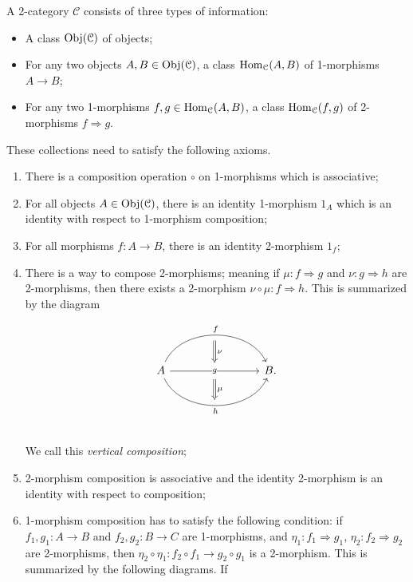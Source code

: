\documentclass[11pt, letterpaper]{article}
\begin{document}
\begin{definition}\label{dfn:8}
	A 2-category $\mathcal{C} $ consists of three types of information:
	\begin{itemize}
		\item A class $\operatorname{Obj}(\mathcal{C} ) $ of objects;
		\item For any two objects $A,B\in \operatorname{Obj}(\mathcal{C} ) $, a class $\operatorname{Hom}_{\mathcal{C} }(A, B) $ of 1-morphisms $A\to B$;
		\item For any two 1-morphisms $f,g\in \operatorname{Hom}_{\mathcal{C} }(A, B) $, a class $\operatorname{Hom}_{\mathcal{C} }(f, g) $ of 2-morphisms $f \Rightarrow g$.
	\end{itemize}
	These collections need to satisfy the following axioms.
	\begin{enumerate}
		\item There is a composition operation $\circ $ on 1-morphisms which is associative;
		\item For all objects $A\in \operatorname{Obj}(\mathcal{C} ) $, there is an identity 1-morphism $1_A$ which is an identity with respect to 1-morphism composition;
		\item For all morphisms $f : A \to B$, there is an identity 2-morphism $1_f$;
		\item There is a way to compose 2-morphisms; meaning if $\mu : f \Rightarrow g$ and $\nu : g \Rightarrow h$ are 2-morphisms, then there exists a 2-morphism $\nu \circ \mu : f \Rightarrow h$. This is summarized by the diagram
			\begin{diagram}[ht]
				\[\begin{tikzcd}[column sep=8em]
    				A
     				\arrow[r, bend left=65, "f"{name=F}]
     				\arrow[r, "g"{inner sep=0,fill=white,anchor=center,name=G}]
     				\arrow[r, bend right=65, "h"{name=H, swap}]
     				\arrow[from=F.south-|G,to=G,Rightarrow,shorten=5pt,"\nu "] 
     				\arrow[from=G,to=H.north-|G,Rightarrow,shorten=5pt,"\mu "] &
   				B.
				\end{tikzcd}\]
				\caption{Vertical Composition}\label{dgm:9}
			\end{diagram}\\
			We call this \emph{vertical composition};
		\item 2-morphism composition is associative and the identity 2-morphism is an identity with respect to composition;
		\item 1-morphism composition has to satisfy the following condition: if $f_1,g_1: A \to B$ and $f_2,g_2: B \to C$ are 1-morphisms, and $\eta _1 : f_1 \Rightarrow g_1$, $\eta _2 : f_2 \Rightarrow g_2$ are 2-morphisms, then $\eta _2 \circ \eta _1 : f_2 \circ f_1 \to g_2 \circ g_1$ is a 2-morphism. This is summarized by the following diagrams. If

\end{enumerate}
\end{definition}
\end{document}
